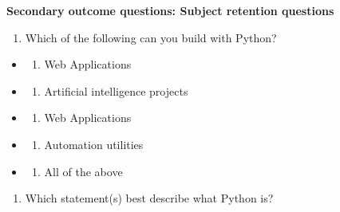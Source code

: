 \documentclass[
]{article}
\providecommand{\tightlist}{%
  \setlength{\itemsep}{0pt}\setlength{\parskip}{0pt}}
\begin{document}
\textbf{Secondary outcome questions: Subject retention questions}

\begin{enumerate}
\def\labelenumi{\arabic{enumi}.}
\tightlist
\item
  Which of the following can you build with Python?
\end{enumerate}

\begin{itemize}
\item
  \begin{enumerate}
  \def\labelenumi{\alph{enumi}.}
  \tightlist
  \item
    Web Applications
  \end{enumerate}
\item
  \begin{enumerate}
  \def\labelenumi{\alph{enumi}.}
  \setcounter{enumi}{1}
  \tightlist
  \item
    Artificial intelligence projects
  \end{enumerate}
\item
  \begin{enumerate}
  \def\labelenumi{\alph{enumi}.}
  \setcounter{enumi}{2}
  \tightlist
  \item
    Web Applications
  \end{enumerate}
\item
  \begin{enumerate}
  \def\labelenumi{\alph{enumi}.}
  \setcounter{enumi}{3}
  \tightlist
  \item
    Automation utilities
  \end{enumerate}
\item
  \begin{enumerate}
  \def\labelenumi{\alph{enumi}.}
  \setcounter{enumi}{4}
  \tightlist
  \item
    All of the above
  \end{enumerate}
\end{itemize}

\begin{enumerate}
\def\labelenumi{\arabic{enumi}.}
\setcounter{enumi}{1}
\tightlist
\item
  Which statement(s) best describe what Python is?
\end{enumerate}
\end{document}
